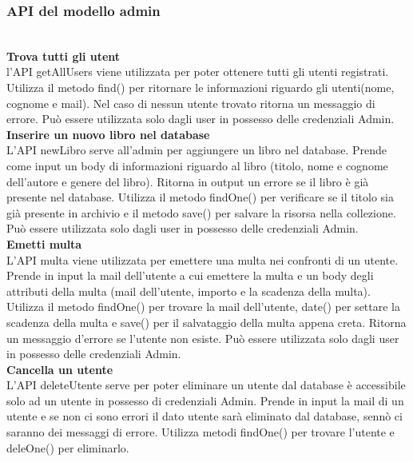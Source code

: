 \documentclass{article}
\begin{document}
\subsubsection{API del modello admin}\\

\noindent \textbf{Trova tutti gli utent}\\
l'API getAllUsers viene utilizzata per poter ottenere tutti gli utenti registrati. Utilizza il metodo find() per ritornare le informazioni riguardo gli utenti(nome, cognome e mail).
Nel caso di nessun utente trovato ritorna un messaggio di errore. Può essere utilizzata solo dagli user in possesso delle credenziali Admin.\\

\noindent \textbf{Inserire un nuovo libro nel database}\\
L'API newLibro serve all'admin per aggiungere un libro nel database. Prende come input un body di informazioni riguardo al libro (titolo, nome e cognome dell'autore e genere del libro). Ritorna in output un errore se il libro è già presente nel database. Utilizza il metodo findOne() per verificare se il titolo sia già presente in archivio e il metodo save() per salvare la risorsa nella collezione. Può essere utilizzata solo dagli user in possesso delle credenziali Admin.\\

\noindent \textbf{Emetti multa}\\
L'API multa viene utilizzata per emettere una multa nei confronti di un utente. Prende in input la mail dell'utente a cui emettere la multa e un body degli attributi della multa (mail dell'utente, importo e la scadenza della multa). Utilizza il metodo findOne() per trovare la mail dell'utente, date() per settare la scadenza della multa e save() per il salvataggio della multa appena creta. Ritorna un messaggio d'errore se l'utente non esiste. Può essere utilizzata solo dagli user in possesso delle credenziali Admin.\\

\noindent \textbf{Cancella un utente}\\
L'API deleteUtente serve per poter eliminare un utente dal database è accessibile solo ad un utente in possesso di credenziali Admin.
Prende in input la mail di un utente e se non ci sono errori il dato utente sarà eliminato dal database, sennò ci saranno dei messaggi di errore.
Utilizza metodi findOne() per trovare l'utente e deleOne() per eliminarlo.\\
\end{document}
